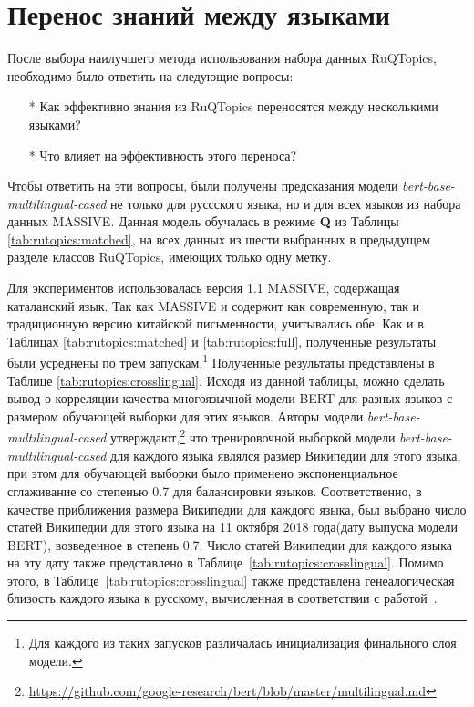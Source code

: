 \section{Перенос знаний между языками}
После выбора наилучшего метода использования набора данных {RuQTopics}, необходимо было ответить на следующие вопросы:
\begin{itemize}
\item[*]Как эффективно знания из {RuQTopics} переносятся между несколькими языками?
\item[*]Что влияет на эффективность этого переноса?
\end{itemize}
Чтобы ответить на эти вопросы, были получены предсказания модели \textit{bert-base-multilingual-cased} не только для руссского языка, но и для всех языков из набора данных {MASSIVE}. Данная модель обучалась в режиме \textbf{Q} из Таблицы \ref{tab:rutopics:matched}, на всех данных из шести выбранных в предыдущем разделе классов {RuQTopics}, имеющих только одну метку.

Для экспериментов использовалась версия 1.1 {MASSIVE}, содержащая каталанский язык. Так как {MASSIVE} и содержит как современную, так и традиционную версию китайской письменности, учитывались обе. Как и в Таблицах \ref{tab:rutopics:matched} и \ref{tab:rutopics:full}, полученные результаты были усреднены по трем запускам.\footnote{Для каждого из таких запусков различалась инициализация финального слоя модели.}
Полученные результаты представлены в Таблице \ref{tab:rutopics:crosslingual}. Исходя из данной таблицы, можно сделать вывод о корреляции качества многоязычной модели BERT для разных языков с размером обучающей выборки для этих языков. Авторы модели \textit{bert-base-multilingual-cased} утверждают,\footnote{\url{https://github.com/google-research/bert/blob/master/multilingual.md}} что тренировочной выборкой модели \textit{bert-base-multilingual-cased} для каждого языка являлся размер Википедии для этого языка, при этом для обучающей выборки было применено экспоненциальное сглаживание со степенью 0.7 для балансировки языков.
Соответственно, в качестве приближения размера Википедии для каждого языка, был выбрано число статей Википедии для этого языка на 11 октября 2018 года(дату выпуска модели BERT), возведенное в степень 0.7.  Число статей Википедии для каждого языка на эту дату также представлено в Таблице~\ref{tab:rutopics:crosslingual}. Помимо этого, в Таблице~\ref{tab:rutopics:crosslingual} также представлена генеалогическая близость каждого языка к русскому, вычисленная в соответствии с работой~\cite{lang_sim}. 


